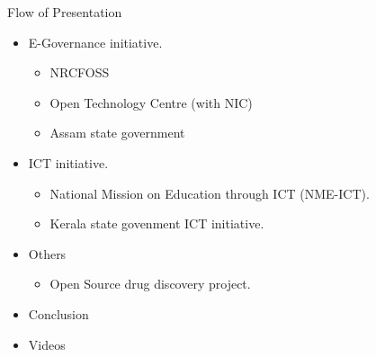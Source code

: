 \documentclass{beamer}
\begin{document}
        \begin{frame}{Flow of Presentation}
            \begin{itemize}[<+->]
                \item E-Governance initiative.
                       \begin{itemize}
                                \item NRCFOSS
                                \item Open Technology Centre (with NIC)
                                \item Assam state government
                       \end{itemize}
                \item ICT initiative.
                         \begin{itemize}
                                  \item National Mission on Education through ICT (NME-ICT).
                                  \item Kerala state govenment ICT initiative. 
                         \end{itemize}
                 
                  \item Others
                          \begin {itemize}
                                \item Open Source drug discovery project.
                          \end {itemize}
                   \item Conclusion
                   \item Videos
          \end {itemize}
      \end{frame}
   
\end{document}
